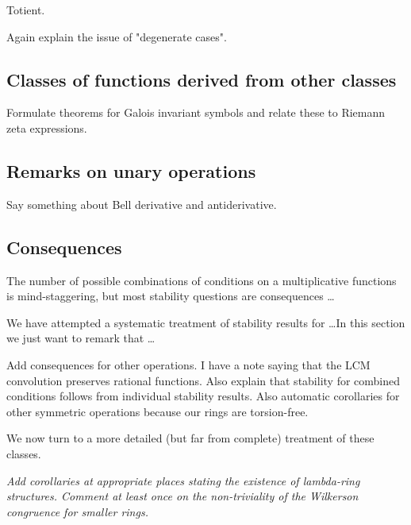\begin{definition}
Totient.
\end{definition}

\begin{remark}
Again explain the issue of "degenerate cases".
\end{remark}


\subsection{Classes of functions derived from other classes}

Formulate theorems for Galois invariant symbols and relate these to Riemann zeta expressions.



\subsection{Remarks on unary operations}

Say something about Bell derivative and antiderivative.



\subsection{Consequences}

The number of possible combinations of conditions on a multiplicative functions is mind-staggering, but most stability questions are consequences \ldots

We have attempted a systematic treatment of stability results for \ldots In this section we just want to remark that \ldots

\begin{remark}
Add consequences for other operations. I have a note saying that the LCM convolution preserves rational functions. Also explain that stability for combined conditions follows from individual stability results. Also automatic corollaries for other symmetric operations because our rings are torsion-free.
\end{remark}

We now turn to a more detailed (but far from complete) treatment of these classes. 

\emph{Add corollaries at appropriate places stating the existence of lambda-ring structures. Comment at least once on the non-triviality of the Wilkerson congruence for smaller rings.}


